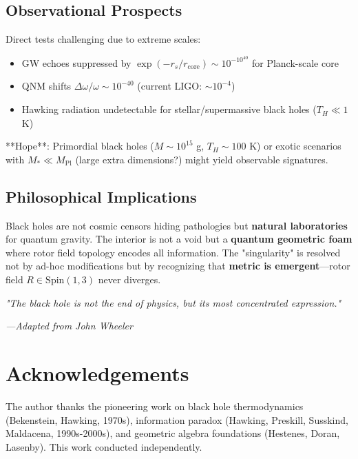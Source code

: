 \documentclass[11pt,a4paper]{article}
\numberwithin{equation}{section}
\theoremstyle{plain}
\theoremstyle{definition}
\theoremstyle{remark}
\newcommand{\Spin}{\mathrm{Spin}}
\begin{document}
\subsection{Observational Prospects}

Direct tests challenging due to extreme scales:
\begin{itemize}
\item GW echoes suppressed by $\exp(-r_s/r_{\text{core}}) \sim 10^{-10^{40}}$ for Planck-scale core
\item QNM shifts $\Delta\omega/\omega \sim 10^{-40}$ (current LIGO: $\sim 10^{-4}$)
\item Hawking radiation undetectable for stellar/supermassive black holes ($T_H \ll 1$ K)
\end{itemize}

**Hope**: Primordial black holes ($M \sim 10^{15}$ g, $T_H \sim 100$ K) or exotic scenarios with $M_* \ll M_{\text{Pl}}$ (large extra dimensions?) might yield observable signatures.

\subsection{Philosophical Implications}

Black holes are not cosmic censors hiding pathologies but \textbf{natural laboratories} for quantum gravity. The interior is not a void but a \textbf{quantum geometric foam} where rotor field topology encodes all information. The "singularity" is resolved not by ad-hoc modifications but by recognizing that \textbf{metric is emergent}—rotor field $R \in \Spin(1,3)$ never diverges.

\vspace{2em}

\noindent\textit{"The black hole is not the end of physics, but its most concentrated expression."}

\vspace{1em}

\noindent\textit{—Adapted from John Wheeler}

\section*{Acknowledgements}

The author thanks the pioneering work on black hole thermodynamics (Bekenstein, Hawking, 1970s), information paradox (Hawking, Preskill, Susskind, Maldacena, 1990s-2000s), and geometric algebra foundations (Hestenes, Doran, Lasenby). This work conducted independently.
\end{document}
